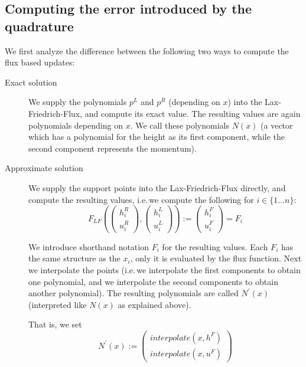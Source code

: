 \documentclass{article}
\begin{document}
\subsection{Computing the error introduced by the quadrature}
\label{sec:goal-intro}

We first analyze the difference between the following two ways to compute the flux based updates:

\begin{description}
\item[Exact solution] We supply the polynomials $p^L$ and $p^R$ (depending on $x$) into the Lax-Friedrich-Flux, and compute its exact value. The resulting values are again polynomials depending on $x$. We call these polynomials $N\left(x\right)$ (a vector which has a polynomial for the height as its first component, while the second component represents the momentum).

\item[Approximate solution] We supply the support points into the Lax-Friedrich-Flux directly, and compute the resulting values, i.e.\,we compute the following for $i \in \{1 \dots n\}$:
  \begin{equation*}
    F_{LF}\left(
      \begin{pmatrix}
        h_i^R \\ u_i^R
      \end{pmatrix},
      \begin{pmatrix}
        h_i^L \\ u_i^L
      \end{pmatrix}
    \right) :=
    \begin{pmatrix}
      h_i^F \\ u_i^F
    \end{pmatrix} = F_i
  \end{equation*}

  We introduce shorthand notation $F_i$ for the resulting values. Each $F_i$ has the same structure as the $x_i$, only it is evaluated by the flux function. Next we interpolate the points (i.e.\,we interpolate the first components to obtain one polynomial, and we interpolate the second components to obtain another polynomial). The resulting polynomials are called $N^\prime\left(x\right)$ (interpreted like $N\left(x\right)$ as explained above).

  That is, we set
  \begin{equation*}
    N^\prime\left(x\right) :=
    \begin{pmatrix}
      interpolate\left(x,h^F\right) \\ interpolate\left(x,u^F\right)
    \end{pmatrix}
  \end{equation*}

\end{description}
\end{document}
